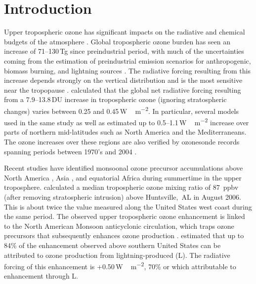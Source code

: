 \chapter{Introduction} \label{ch:introduction}

\ifpdf
    \graphicspath{{Chapter_introduction/figures/PNG/}{Chapter_introduction/figures/PDF/}{Chapter_introduction/figures/}}
\else
    \graphicspath{{Chapter_introduction/figures/EPS/}{Chapter_introduction/figures/}}
\fi

Upper tropospheric ozone has significant impacts on the radiative and chemical budgets of the atmosphere \citep{Kiehl:1999uq}. Global tropospheric ozone burden has seen an increase of 71--130\,\unit{Tg} since preindustrial period, with much of the uncertainties coming from the estimation of preindustrial emission scenarios for anthropogenic, biomass burning, and lightning sources \citep[][and references therein]{Lamarque:2005gb}. The radiative forcing resulting from this increase depends strongly on the vertical distribution and is the most sensitive near the tropopause \citep{Lacis:1990fk}. \citet{Gauss:2006zr} calculated that the global net radiative forcing resulting from a 7.9--13.8\,\unit{DU} increase in tropospheric ozone (ignoring stratospheric changes) varies between 0.25 and 0.45\,\unit{W\,m^{-2}}. In particular, several models used in the same study as well as \citet{Stevenson:1998fk} estimated up to 0.5--1.1\,\unit{W \,m^{-2}} increase over parts of northern mid-latitudes such as North America and the Mediterraneans. The ozone increases over these regions are also verified by ozonesonde records spanning periods between 1970's and 2004 \citep{Oltmans:2006kc}.


Recent studies have identified monsoonal ozone precursor accumulations above North America \citep[][and references therein]{Li:2005ss,Cooper:2009nx}, Asia \citep{Park:2007bh,Worden:2009ve}, and equatorial Africa \citep{Bouarar:2011ly} during summertime in the upper troposphere. \citet{Cooper:2007cr} calculated a median tropospheric ozone mixing ratio of 87~\unit{ppbv} (after removing stratospheric intrusion) above Huntsville,~AL in August 2006. This is about twice the value measured along the United States west coast during the same period. The observed upper tropospheric ozone enhancement is linked to the North American Monsoon anticyclonic circulation, which traps ozone precursors that subsequently enhances ozone production \citep{Li:2005ss}. \citet{Cooper:2006dq} estimated that up to 84\% of the enhancement observed above southern United States can be attributed to {\insitu} ozone production from lightning-produced  (L). The radiative forcing of this enhancement is +0.50\,\unit{W\,m^{-2}}, 70\% or which attributable to enhancement through L.

